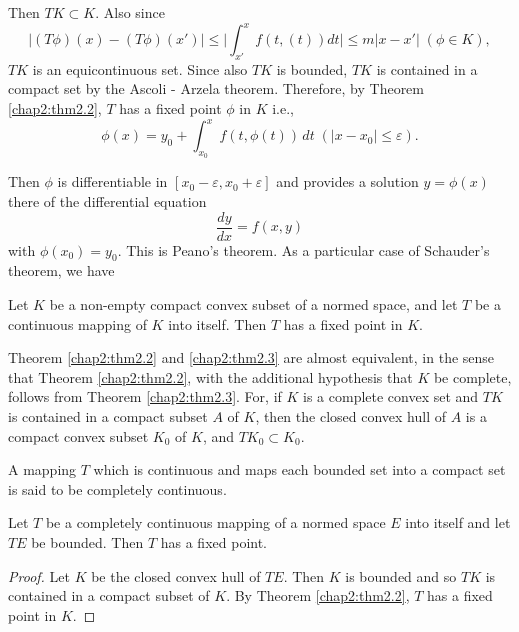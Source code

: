 Then $T K \subset K$. Also since
 $$
 \bigg| (T \phi) (x) - (T \phi) (x') \bigg| \le \bigg| \int^x_{x'}
 f(t, (t)) dt \bigg| \le m | x - x' |\; (\phi \in K), 
 $$
$T K$ is an equicontinuous set. Since also $T K $ is bounded, $T K$
 is contained in a compact set by the Ascoli - Arzela
 theorem. Therefore, by Theorem \ref{chap2:thm2.2}, $T$ has a fixed
 point $\phi$ in $K$ i.e., 
$$
\phi (x) = y_0 + \int^x_{x_0} f (t, \phi (t)) \, dt \; (|x - x_0| \le
\varepsilon). 
$$

Then $\phi$ is differentiable in $[x_0 - \varepsilon, x_0  +
  \varepsilon]$ and provides a solution $y = \phi (x)$ there of the
differential equation 
$$
\frac{dy}{dx} = f(x, y)
$$\pageoriginale
with $\phi (x_0) = y_0$. This is Peano's theorem. As a particular case
of Schauder's theorem, we have 

\begin{thmm}\label{chap2:thm2.3}%
  Let $K$ be a non-empty compact convex subset of a normed space, and
  let $T$ be a continuous mapping of $K$ into itself. Then $T$ has a
  fixed point in $K$. 
\end{thmm}

\begin{remark*}%
  Theorem \ref{chap2:thm2.2} and \ref{chap2:thm2.3} are almost
  equivalent, in the sense that Theorem 
  \ref{chap2:thm2.2}, with the additional hypothesis that $K$ be
  complete, follows 
  from Theorem \ref{chap2:thm2.3}. For, if $K$ is a complete convex
  set and $T K $ is 
  contained in a compact subset $A$ of $K$, then the closed convex
  hull of $A$ is a compact convex subset $K_0$ of $K$, and $T K_0
  \subset K_0$. 
\end{remark*}

\begin{Definition}%
  A mapping $T$ which is continuous and maps each boun\-ded set into a
  compact set is said to be completely continuous. 
\end{Definition}

\begin{thmm}\label{chap2:thm2.4}%
  Let $T$ be a completely continuous mapping of a normed space $E$
  into itself and let $T E$ be bounded. Then $T$ has a fixed point. 
\end{thmm}

\begin{proof}
  Let $K$ be the closed convex hull of $T E$. Then $K$ is bounded and
  so $T K$ is contained in a compact subset of $K$. By Theorem
  \ref{chap2:thm2.2}, 
  $T$ has a fixed point in $K$. 
\end{proof}

